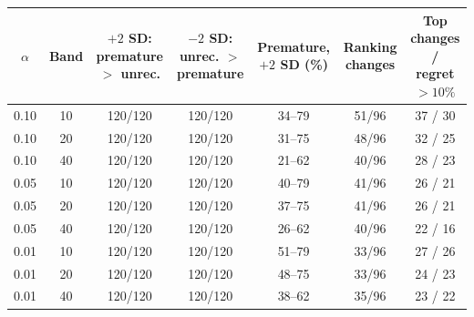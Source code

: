 \begin{tabular}{ccccccc}\toprule
$\alpha$ & Band & $+2$ SD: premature $>$ unrec. & $-2$ SD: unrec. $>$ premature & Premature, $+2$ SD (\%) & Ranking changes & Top changes / regret $>10\%$ \\ \midrule
0.10 & 10 & 120/120 & 120/120 & 34--79 & 51/96 & 37 / 30 \\
0.10 & 20 & 120/120 & 120/120 & 31--75 & 48/96 & 32 / 25 \\
0.10 & 40 & 120/120 & 120/120 & 21--62 & 40/96 & 28 / 23 \\
0.05 & 10 & 120/120 & 120/120 & 40--79 & 41/96 & 26 / 21 \\
0.05 & 20 & 120/120 & 120/120 & 37--75 & 41/96 & 26 / 21 \\
0.05 & 40 & 120/120 & 120/120 & 26--62 & 40/96 & 22 / 16 \\
0.01 & 10 & 120/120 & 120/120 & 51--79 & 33/96 & 27 / 26 \\
0.01 & 20 & 120/120 & 120/120 & 48--75 & 33/96 & 24 / 23 \\
0.01 & 40 & 120/120 & 120/120 & 38--62 & 35/96 & 23 / 22 \\
\bottomrule\end{tabular}
